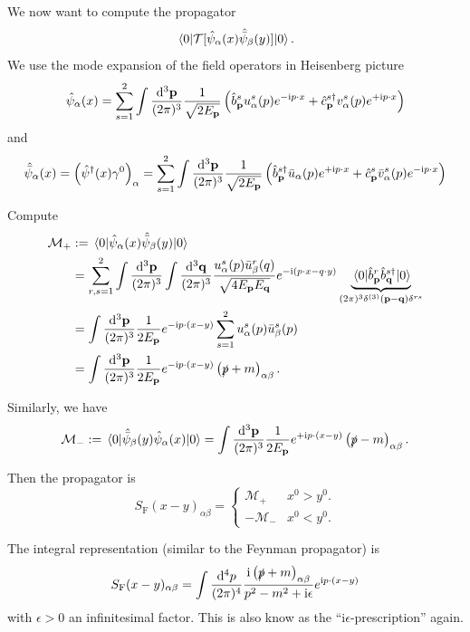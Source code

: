 \documentclass[a4paper,11pt]{article}
\begin{document}
	We now want to compute the propagator
	\[
		\mel{0}{\mathcal{T}[\hat \psi_\alpha(x) \hat{\bar \psi}_\beta(y)]}{0}.
	\]
	We use the mode expansion of the field operators in Heisenberg picture
	\[
		\hat \psi_\alpha(x) = \sum _{s = 1}^2 \int \frac{\dd[3]{\vb p}}{(2\pi)^{3}} \frac{1}{\sqrt{2 E _{\vb p}}} \left( \hat b^s_{\vb p} u^s_\alpha(p) e ^{- \mathrm{i} p \cdot x} + \hat c^{s\dagger}_{\vb p} v^s_\alpha(p) e ^{+ \mathrm{i} p \cdot x} \right)
	\]
	and 
	\[
		\hat{\bar \psi}_\alpha(x) = \left( \hat \psi^{\dagger}(x) \gamma^0 \right)_\alpha = \sum _{s = 1}^2 \int \frac{\dd[3]{\vb p}}{(2\pi)^{3}} \frac{1}{\sqrt{2 E _{\vb p}}} \left( \hat b^{s\dagger}_{\vb p}\bar u_\alpha(p) e ^{+ \mathrm{i} p \cdot x} + \hat c^s _{\vb p} \bar v^s_\alpha(p) e ^{- \mathrm{i} p \cdot x} \right)
	\]
	
	Compute
	\begin{align*}
		\mathcal{M}_+ &:= \mel{0}{\hat \psi_\alpha(x) \hat{\bar \psi}_\beta(y)}{0}\\
		& = \sum _{r,s = 1}^2 \int \frac{\dd[3]{\vb p}}{(2\pi)^{3}} \int \frac{\dd[3]{\vb q}}{(2\pi)^{3}} \frac{u_\alpha^s(p)\bar u_\beta^r(q)}{\sqrt{4 E _{\vb p}E _{\vb q}}} e ^{- \mathrm{i} (p\cdot x - q \cdot y)} \underbrace{\mel{0}{\hat b^r _{\vb p} \hat b^{s\dagger}_{\vb q}}{0}}_{(2 \pi)^3 \delta ^{(3)}(\vb p - \vb q) \delta ^{rs}}\\
		& = \int \frac{\dd[3]{\vb p}}{(2\pi)^{3}} \frac{1}{2 E _{\vb p}} e ^{- \mathrm{i} p \cdot (x-y)} \sum _{s = 1}^2 u_\alpha^s(p)\bar u_\beta^s(p)\\
		& = \int \frac{\dd[3]{\vb p}}{(2\pi)^{3}} \frac{1}{2 E _{\vb p}} e ^{- \mathrm{i} p \cdot (x-y)} \left(\slashed{p} + m\right)_{\alpha \beta}.
	\end{align*}
	
	Similarly, we have 
	\[
		\mathcal{M}_- := \mel{0}{\hat{\bar \psi}_\beta(y)\hat \psi_\alpha(x)}{0} = \int \frac{\dd[3]{\vb p}}{(2\pi)^{3}} \frac{1}{2 E _{\vb p}} e ^{+ \mathrm{i} p \cdot (x-y)} \left( \slashed{p} - m\right)_{\alpha \beta}.
	\]
	
	Then the propagator is 
	\[
		S _{\text{F}} (x-y) _{\alpha \beta} = \begin{cases}
			\mathcal{M}_+ & x^0 > y^0.\\
			-\mathcal{M}_- & x^0 < y^0.
		\end{cases}
	\]

	The integral representation (similar to the Feynman propagator) is
	\[
		S _{\text{F}} (x - y) _{\alpha \beta} = \int \frac{\dd[4]{p}}{(2\pi)^{4}} \frac{\mathrm{i} \left( \slashed{p} + m \right) _{\alpha \beta}}{p^2 - m^2 + \mathrm{i} \epsilon} e ^{\mathrm{i} p \cdot (x-y)}
	\]
	with $\epsilon > 0$ an infinitesimal factor. This is also know as the ``$\mathrm{i} \epsilon$-prescription'' again.
	
\end{document}
